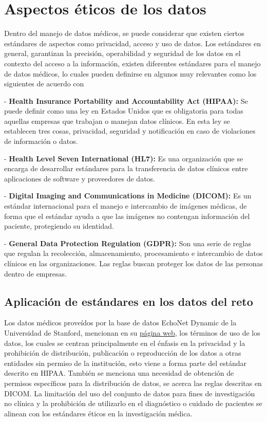\documentclass[runningheads]{llncs}
\begin{document}
\section{Aspectos éticos de los datos}

Dentro del manejo de datos médicos, se puede considerar que existen ciertos estándares de aspectos como privacidad, acceso y uso de datos. Los estándares en general, garantizan la precisión, operabilidad y seguridad de los datos en el contexto del acceso a la información, existen diferentes estándares para el manejo de datos médicos, lo cuales pueden definirse en algunos muy relevantes como los siguientes de acuerdo con \cite{allhealthtech2022}

- \textbf{Health Insurance Portability and Accountability Act (HIPAA): } Se puede definir como una ley en Estados Unidos que es obligatoria para todas aquellas empresas que trabajan o manejan datos clínicos. En esta ley se establecen tres cosas, privacidad, seguridad y notificación en caso de violaciones de información o datos.

- \textbf{Health Level Seven International (HL7):}  Es una organización que se encarga de desarrollar estándares para la transferencia de datos clínicos entre aplicaciones de software y proveedores de datos.

- \textbf{Digital Imaging and Communications in Medicine (DICOM): } Es un estándar internacional para el manejo e intercambio de imágenes médicas, de forma que el estándar ayuda a que las imágenes no contengan información del paciente, protegiendo su identidad.

- \textbf{General Data Protection Regulation (GDPR): } Son una serie de reglas que regulan la recolección, almacenamiento, procesamiento e intercambio de datos clínicos en las organizaciones. Las reglas buscan proteger los datos de las personas dentro de empresas.

\subsection{Aplicación de estándares en los datos del reto}

Los datos médicos proveídos por la base de datos EchoNet Dynamic de la Universidad de Stanford, mencionan en su  \href{https://echonet.github.io/dynamic/index.html#paper}{página web}, los términos de uso de los datos, los cuales se centran principalmente en el énfasis en la privacidad y la prohibición de distribución, publicación o reproducción de los datos a otras entidades sin permiso de la institución, esto viene a forma parte del estándar descrito en HIPAA. También se menciona una necesidad de obtención de permisos específicos para la distribución de datos, se acerca las reglas descritas en DICOM. La limitación del uso del conjunto de datos para fines de investigación no clínica y la prohibición de utilizarlo en el diagnóstico o cuidado de pacientes se alinean con los estándares éticos en la investigación médica. 
\end{document}
